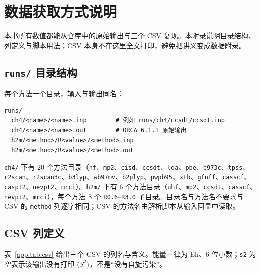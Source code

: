 
\section{数据获取方式说明}
\label{app:data}

本书所有数值都能从仓库中的原始输出与三个 CSV 复现。本附录说明目录结构、列定义与脚本用法；CSV 本身不在这里全文打印，避免把讲义变成数据附录。

\subsection{\texttt{runs/} 目录结构}

每个方法一个目录，输入与输出同名：
\begin{lstlisting}
runs/
  ch4/<name>/<name>.inp        # 例如 runs/ch4/ccsdt/ccsdt.inp
  ch4/<name>/<name>.out        # ORCA 6.1.1 原始输出
  h2m/<method>/R<value>/<method>.inp
  h2m/<method>/R<value>/<method>.out
\end{lstlisting}
\texttt{ch4/} 下有 20 个方法目录（\texttt{hf}、\texttt{mp2}、\texttt{cisd}、\texttt{ccsdt}、\texttt{lda}、\texttt{pbe}、\texttt{b973c}、\texttt{tpss}、\texttt{r2scan}、\texttt{r2scan3c}、\texttt{b3lyp}、\texttt{wb97mv}、\texttt{b2plyp}、\texttt{pwpb95}、\texttt{xtb}、\texttt{gfnff}、\texttt{casscf}、\texttt{caspt2}、\texttt{nevpt2}、\texttt{mrci}）。\texttt{h2m/} 下有 6 个方法目录（\texttt{uhf}、\texttt{mp2}、\texttt{ccsdt}、\texttt{casscf}、\texttt{nevpt2}、\texttt{mrci}），每个方法 8 个 \texttt{R0.6}--\texttt{R3.0} 子目录。目录名与方法名不要求与 CSV 的 \texttt{method} 列逐字相同；CSV 的方法名由解析脚本从输入回显中读取。

\subsection{CSV 列定义}

表~\ref{app:tab:csv} 给出三个 CSV 的列名与含义。能量一律为 Eh、6 位小数；\texttt{s2} 为空表示该输出没有打印 $\langle S^2\rangle$，不是“没有自旋污染”。

